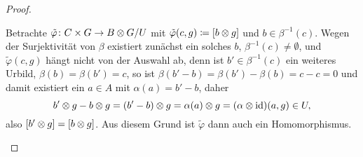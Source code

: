 \begin{proof}
\begin{enumerate}
\begin{enumerate}
\begin{enumerate}[($\alpha$)]
              Betrachte $\tilde \varphi \colon C \times G \to B \otimes G / U$ mit $\tilde \varphi (c,g) \coloneqq [ b \otimes g ]$ und $b \in \beta^{-1}(c)$.
              Wegen der Surjektivität von $\beta$ existiert zunächst ein solches $b$, $\beta^{-1}(c) \neq \emptyset$, und $\tilde \varphi(c,g)$ hängt nicht von der Auswahl ab, denn ist $b' \in \beta^{-1}(c)$ ein weiteres Urbild, $\beta(b) = \beta(b') = c$, so ist $\beta(b' - b) = \beta(b') - \beta(b) = c - c = 0$ und damit existiert ein $a \in A$ mit $\alpha(a) = b' - b$, daher
              \begin{equation*}
                b' \otimes g - b \otimes g = (b' - b) \otimes g = \alpha(a) \otimes g = (\alpha \otimes \operatorname{id})(a, g) \in U,
              \end{equation*}
              also $[b' \otimes g] = [b \otimes g]$.
              Aus diesem Grund ist $\tilde \varphi$ dann auch ein Homomorphismus.
          \end{enumerate}
      \end{enumerate}
  \end{enumerate}
\end{proof}
